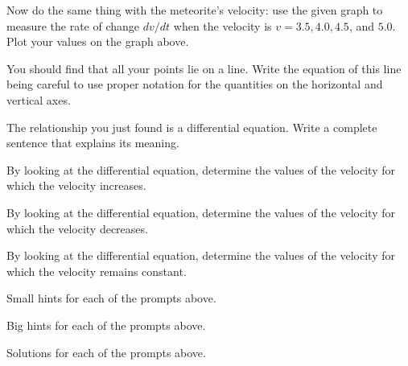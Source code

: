 \begin{activity}
          \begin{center}
          \end{center}
        \item Now do the same thing with the meteorite's velocity:
          use the given graph to measure the rate of change $dv/dt$ when the velocity is
          $v=3.5,4.0,4.5$, and $5.0$.  Plot your values on the graph
          above. 
        \item You should find that all your points lie on a line.
          Write the equation of this line being careful to use proper
          notation for the quantities on the horizontal and vertical
          axes.
        \item The relationship you just found is a differential
          equation.  Write a complete sentence that explains its
          meaning. 
        \item By looking at the differential equation, determine the
          values of the velocity for which the velocity 
          increases.
        \item By looking at the differential equation, determine the
          values of the velocity for which the velocity 
          decreases.
        \item By looking at the differential equation, determine the
          values of the velocity for which the velocity 
          remains constant.

\ea
\end{activity}
\begin{smallhint}
\ba
	\item Small hints for each of the prompts above.
\ea
\end{smallhint}
\begin{bighint}
\ba
	\item Big hints for each of the prompts above.
\ea
\end{bighint}
\begin{activitySolution}
\ba
	\item Solutions for each of the prompts above.
\ea
\end{activitySolution}
\aftera